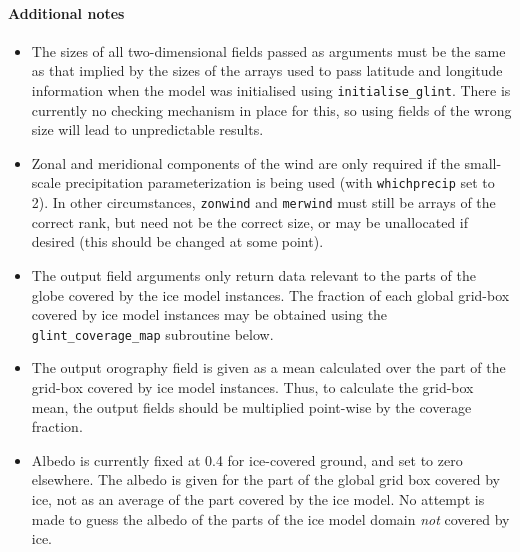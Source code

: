 \paragraph{Additional notes}
%
\begin{itemize}
\item The sizes of all two-dimensional fields passed as arguments must be the
  same as that implied by the sizes of the arrays used to pass latitude and
  longitude information when the model was initialised using
  \texttt{initialise\_glint}. There is
  currently no checking mechanism in place for this, so using fields of the wrong size
  will lead to unpredictable results.
\item Zonal and meridional components of the wind are only required if the
  small-scale precipitation parameterization is being used (with
  \texttt{whichprecip} set to 2). In other circumstances, \texttt{zonwind} and
  \texttt{merwind} must still be arrays of the correct rank, but need not be
  the correct size, or may be unallocated if desired (this should be changed
  at some point).
\item The output field arguments only return data relevant to the parts of the globe
  covered by the ice model instances. The fraction of each global
  grid-box covered by ice model instances may be obtained using the
  \texttt{glint\_coverage\_map} subroutine below. 
\item The output orography field is given as a mean calculated over the part
  of the grid-box covered by ice  model instances. Thus, to calculate the
  grid-box mean, the output fields should be multiplied point-wise by the
  coverage fraction. 
\item Albedo is currently fixed at 0.4 for ice-covered ground, and set to zero
  elsewhere. The albedo is given for the part of the global grid box covered
  by ice, not as an average of the part covered by the ice model. No attempt
  is made to guess the albedo of the parts of the ice model domain \emph{not}
  covered by ice.
\end{itemize}
%
